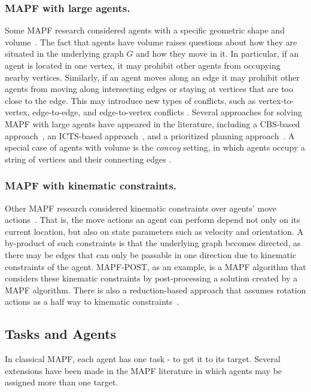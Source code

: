\documentclass[letterpaper]{article} %
\newcommand{\mapf}{\ac{MAPF}\xspace}
\begin{document}
\subsubsection{\mapf with large agents.}
Some \mapf research considered agents with a specific geometric shape and volume~\cite{li2019multi,walker2018extended,yakovlev2017any,thomas2015extended}. The fact that agents have volume raises questions about how they are situated in the underlying graph $G$ and how they move in it. In particular, if an agent is located in one vertex, it may prohibit other agents from occupying nearby vertices.
Similarly, if an agent moves along an edge it may prohibit other agents from moving along intersecting edges or staying at vertices that are too close to the edge. This may introduce new types of conflicts, such as vertex-to-vertex, edge-to-edge, and edge-to-vertex conflicts \cite{honig2018trajectory}.
Several approaches for solving \mapf with large agents have appeared in the literature, including a CBS-based approach~\cite{li2019multi}, an ICTS-based approach~\cite{walker2018extended}, and a prioritized planning approach~\cite{yakovlev2017any}. A special case of agents with volume is the \emph{convoy} setting, in which agents occupy a string of vertices and their connecting edges \cite{thomas2015extended}.
\subsubsection{\mapf with kinematic constraints.}
Other \mapf research considered kinematic constraints over agents' move actions~\cite{honig2017summary,walker17hierarchical}. That is, the move actions an agent can perform depend not only on its current location, but also on state parameters such as velocity and orientation. A by-product of such constraints is that the underlying graph becomes directed, as there may be edges that can only be passable in one direction due to kinematic constraints of the agent.  MAPF-POST, as an example, is a \mapf algorithm that considers these kinematic constraints by post-processing a solution created by a \mapf algorithm. There is also a reduction-based approach that assumes rotation actions as a half way to kinematic constraints~\cite{BartakIBERAMIA18}.
\subsection{Tasks and Agents}
In classical MAPF, each agent has one task - to get it to its target. Several extensions have been made in the MAPF literature in which agents may be assigned more than one target.
\end{document}
